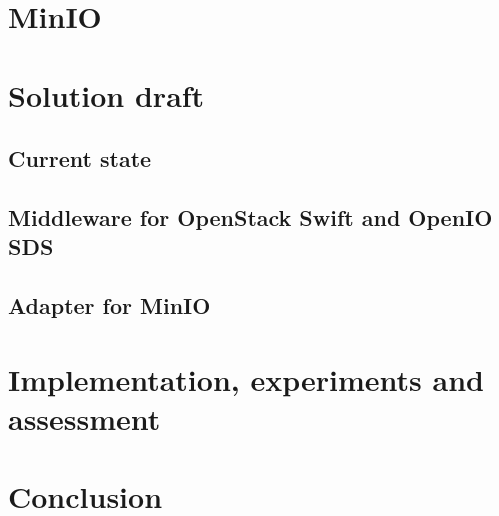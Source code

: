 \chapter{MinIO}

\chapter{Solution draft}
\section{Current state}
\section{Middleware for OpenStack Swift and OpenIO SDS}
\section{Adapter for MinIO}
\chapter{Implementation, experiments and assessment}

\chapter{Conclusion}

